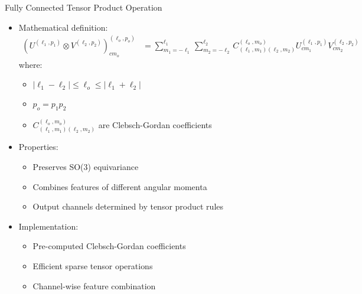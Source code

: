\begin{frame}{Fully Connected Tensor Product Operation}
    \begin{itemize}
        \item Mathematical definition:
        \begin{align*}
            (U^{(\ell_1,p_1)} \otimes V^{(\ell_2,p_2)})^{(\ell_o,p_o)}_{cm_o} &= \sum_{m_1=-\ell_1}^{\ell_1} \sum_{m_2=-\ell_2}^{\ell_2} C^{(\ell_o,m_o)}_{(\ell_1,m_1)(\ell_2,m_2)} U^{(\ell_1,p_1)}_{cm_1} V^{(\ell_2,p_2)}_{cm_2}
        \end{align*}
        where:
        \begin{itemize}
            \item $|\ell_1 - \ell_2| \leq \ell_o \leq |\ell_1 + \ell_2|$
            \item $p_o = p_1p_2$
            \item $C^{(\ell_o,m_o)}_{(\ell_1,m_1)(\ell_2,m_2)}$ are Clebsch-Gordan coefficients
        \end{itemize}
        \item Properties:
        \begin{itemize}
            \item Preserves SO(3) equivariance
            \item Combines features of different angular momenta
            \item Output channels determined by tensor product rules
        \end{itemize}
        \item Implementation:
        \begin{itemize}
            \item Pre-computed Clebsch-Gordan coefficients
            \item Efficient sparse tensor operations
            \item Channel-wise feature combination
        \end{itemize}
    \end{itemize}
\end{frame}

